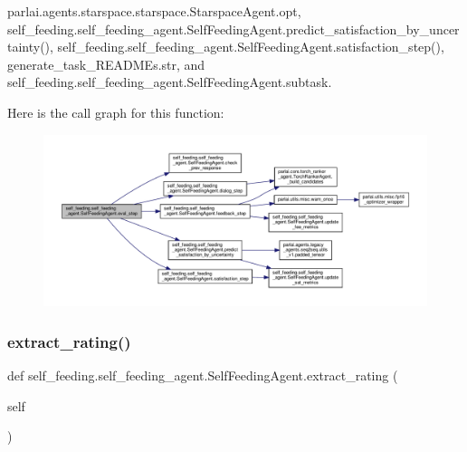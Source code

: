 parlai.\+agents.\+starspace.\+starspace.\+Starspace\+Agent.\+opt, self\+\_\+feeding.\+self\+\_\+feeding\+\_\+agent.\+Self\+Feeding\+Agent.\+predict\+\_\+satisfaction\+\_\+by\+\_\+uncertainty(), self\+\_\+feeding.\+self\+\_\+feeding\+\_\+agent.\+Self\+Feeding\+Agent.\+satisfaction\+\_\+step(), generate\+\_\+task\+\_\+\+R\+E\+A\+D\+M\+Es.\+str, and self\+\_\+feeding.\+self\+\_\+feeding\+\_\+agent.\+Self\+Feeding\+Agent.\+subtask.

Here is the call graph for this function\+:
\nopagebreak
\begin{figure}[H]
\begin{center}
\leavevmode
\includegraphics[width=350pt]{classself__feeding_1_1self__feeding__agent_1_1SelfFeedingAgent_a9f6ed50b9db65bede09f19810e05abc4_cgraph}
\end{center}
\end{figure}
\mbox{\label{classself__feeding_1_1self__feeding__agent_1_1SelfFeedingAgent_a85ecc5ffb61d545ae003232ffb1e0f57}} 
\subsubsection{\texorpdfstring{extract\+\_\+rating()}{extract\_rating()}}
{\footnotesize\ttfamily def self\+\_\+feeding.\+self\+\_\+feeding\+\_\+agent.\+Self\+Feeding\+Agent.\+extract\+\_\+rating (\begin{DoxyParamCaption}\item[{}]{self }\end{DoxyParamCaption})}

